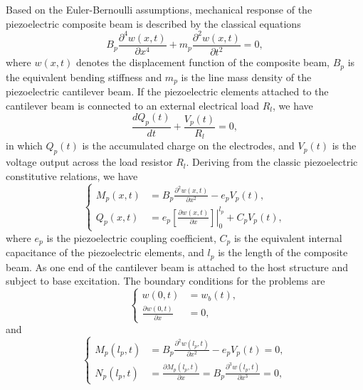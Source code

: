 \documentclass{svjour3}                     %
\begin{document}
Based on the Euler-Bernoulli assumptions, mechanical response of the piezoelectric composite beam is described by the classical equations
\begin{equation}
    B_p \frac{\partial^4 w(x,t)}{\partial x^4} + m_p \frac{\partial^2 w(x,t)}{\partial t^2} = 0,
\end{equation}
where $w(x,t)$ denotes the displacement function of the composite beam, $B_p$ is the equivalent bending stiffness and $m_p$ is the line mass density of the piezoelectric cantilever beam. If the piezoelectric elements attached to the cantilever beam is connected to an external electrical load $R_l$, we have 
\begin{equation}
    \frac{d Q_p(t)}{d t} + \frac{V_p(t)}{R_l} = 0,
\end{equation}
in which $Q_p(t)$ is the accumulated charge on the electrodes, and $V_p(t)$ is the voltage output across the load resistor $R_l$. Deriving from the classic piezoelectric constitutive relations, we have 
\begin{equation}
    \left\{\begin{aligned}
        M_p(x,t) &= B_p \frac{\partial^2 w(x,t)}{\partial x^2} - e_p V_p(t), \\
        Q_p(x,t) &= e_p \left.\left[ \frac{\partial w(x,t)}{\partial x} \right]\right|_0^{l_p} + C_p V_p(t),
    \end{aligned}\right.
\end{equation}
where $e_p$ is the piezoelectric coupling coefficient, $C_p$ is the equivalent internal capacitance of the piezoelectric elements, and $l_p$ is the length of the composite beam. As one end of the cantilever beam is attached to the host structure and subject to base excitation. The boundary conditions for the problems are 
\begin{equation}
    \left\{\begin{aligned}
        w(0,t) &= w_b(t), \\
        \frac{\partial w(0,t)}{\partial x} &= 0,
    \end{aligned}\right.
\end{equation}
and
\begin{equation}
    \left\{\begin{aligned}
        M_p(l_p,t) &= B_p \frac{\partial^2 w(l_p,t)}{\partial x^2} - e_p V_p(t) = 0, \\
        N_p(l_p,t) &= \frac{\partial M_p(l_p,t)}{\partial x} = B_p \frac{\partial^3 w(l_p,t)}{\partial x^3} = 0,
    \end{aligned}\right.
\end{equation}
\end{document}
